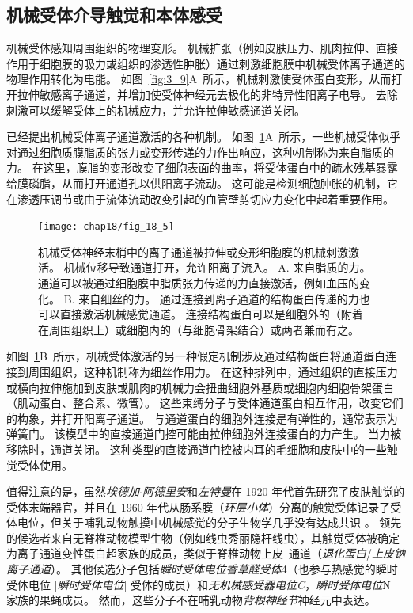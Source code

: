 \subsection{机械受体介导触觉和本体感受}

机械受体感知周围组织的物理变形。
机械扩张（例如皮肤压力、肌肉拉伸、直接作用于细胞膜的吸力或组织的渗透性肿胀）通过刺激细胞膜中机械受体离子通道的物理作用转化为电能。
如图~\ref{fig:3_9}A~所示，机械刺激使受体蛋白变形，从而打开拉伸敏感离子通道，并增加使受体神经元去极化的非特异性阳离子电导。
去除刺激可以缓解受体上的机械应力，并允许拉伸敏感通道关闭。


已经提出机械受体离子通道激活的各种机制。
如图~\ref{fig:18_5}A~所示，一些机械受体似乎对通过细胞质膜脂质的张力或变形传递的力作出响应，这种机制称为来自脂质的力。
在这里，膜脂的变形改变了细胞表面的曲率，将受体蛋白中的疏水残基暴露给膜磷脂，从而打开通道孔以供阳离子流动。
这可能是检测细胞肿胀的机制，它在渗透压调节或由于流体流动改变引起的血管壁剪切应力变化中起着重要作用。


\begin{figure}[htbp]
	\centering
	\texttt{[image: chap18/fig\_18\_5]}
	\caption{机械受体神经末梢中的离子通道被拉伸或变形细胞膜的机械刺激激活。
		机械位移导致通道打开，允许阳离子流入\cite{lin2005trp}。
		A. 来自脂质的力。
		通道可以被通过细胞膜中脂质张力传递的力直接激活，例如血压的变化。
		B. 来自细丝的力。
		通过连接到离子通道的结构蛋白传递的力也可以直接激活机械感觉通道。
		连接结构蛋白可以是细胞外的（附着在周围组织上）或细胞内的（与细胞骨架结合）或两者兼而有之。}
	\label{fig:18_5}
\end{figure}


如图~\ref{fig:18_5}B~所示，机械受体激活的另一种假定机制涉及通过结构蛋白将通道蛋白连接到周围组织，这种机制称为细丝作用力。
在这种排列中，通过组织的直接压力或横向拉伸施加到皮肤或肌肉的机械力会扭曲细胞外基质或细胞内细胞骨架蛋白（肌动蛋白、整合素、微管）。
这些束缚分子与受体通道蛋白相互作用，改变它们的构象，并打开阳离子通道。
与通道蛋白的细胞外连接是有弹性的，通常表示为弹簧门。
该模型中的直接通道门控可能由拉伸细胞外连接蛋白的力产生。
当力被移除时，通道关闭。
这种类型的直接通道门控被内耳的毛细胞和皮肤中的一些触觉受体使用。


值得注意的是，虽然\textit{埃德加$\cdot$阿德里安}和\textit{左特曼}在 1920 年代首先研究了皮肤触觉的受体末端器官，并且在 1960 年代从肠系膜（\textit{环层小体}）分离的触觉受体记录了受体电位，但关于哺乳动物触摸中机械感觉的分子生物学几乎没有达成共识 。
领先的候选者来自无脊椎动物模型生物（例如线虫秀丽隐杆线虫），其触觉受体被确定为离子通道变性蛋白超家族的成员，类似于脊椎动物上皮~通道（\textit{退化蛋白}/\textit{上皮钠离子通道}）。
其他候选分子包括\textit{瞬时受体电位香草醛受体}4（也参与热感觉的瞬时受体电位 [\textit{瞬时受体电位}] 受体的成员）和\textit{无机械感受器电位C}，\textit{瞬时受体电位}N 家族的果蝇成员。
然而，这些分子不在哺乳动物\textit{背根神经节}神经元中表达。


